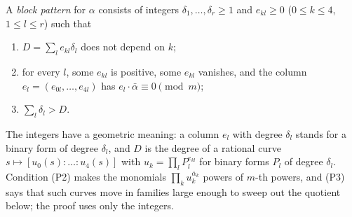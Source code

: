 \begin{definition}\label{def:blockpattern}
A \emph{block pattern} for $\alpha$ consists of integers $\delta_{1},\dots,
\delta_{r}\ge1$ and $e_{kl}\ge0$ ($0\le k\le4$, $1\le l\le r$) such that
\begin{enumerate}[label=\textup{(P\arabic*)}]
\item $D=\sum_{l}e_{kl}\delta_{l}$ does not depend on $k$;
\item for every $l$, some $e_{kl}$ is positive, some $e_{kl}$ vanishes, and
the column $e_{l}=(e_{0l},\dots,e_{4l})$ has $e_{l}\cdot\bar\alpha\equiv0
\pmod m$;
\item $\sum_{l}\delta_{l}>D$.
\end{enumerate}
\end{definition}

The integers have a geometric meaning: a column $e_{l}$ with degree
$\delta_{l}$ stands for a binary form of degree $\delta_{l}$, and $D$ is the
degree of a rational curve $s\mapsto[u_{0}(s):\dots:u_{4}(s)]$ with
$u_{k}=\prod_{l}P_{l}^{e_{kl}}$ for binary forms $P_{l}$ of degree
$\delta_{l}$. Condition (P2) makes the monomials $\prod_{k}u_{k}^{\bar
\alpha_{k}}$ powers of $m$-th powers, and (P3) says that such curves move in
families large enough to sweep out the quotient below; the proof uses only
the integers.

